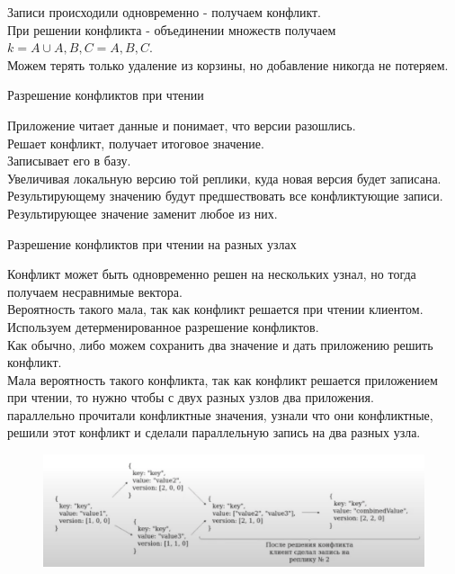 Записи происходили одновременно - получаем конфликт.\\
При решении конфликта - объединении множеств получаем $k = {A} \cup {A, B, C} = {A, B, C}.$\\
Можем терять только удаление из корзины, но добавление никогда не потеряем.\\
\begin{definition}
  Разрешение конфликтов при чтении
\end{definition}
Приложение читает данные и понимает, что версии разошлись.\\
Решает конфликт, получает итоговое значение.\\
Записывает его в базу.\\
Увеличивая локальную версию той реплики, куда новая версия будет записана.\\
Результирующему значению будут предшествовать все конфликтующие записи.\\
Результирующее значение заменит любое из них.\\
\begin{definition}
  Разрешение конфликтов при чтении на разных узлах
\end{definition}
Конфликт может быть одновременно решен на нескольких узнал, но тогда получаем несравнимые вектора.\\
Вероятность такого мала, так как конфликт решается при чтении клиентом.\\
Используем детерменированное разрешение конфликтов.\\
Как обычно, либо можем сохранить два значение и дать приложению решить конфликт.\\
Мала вероятность такого конфликта, так как конфликт решается приложением при чтении, то нужно чтобы с двух разных узлов два приложения.\\ параллельно прочитали конфликтные значения, узнали что они конфликтные, решили этот конфликт и сделали параллельную запись на два разных узла.\\
\begin{figure}[h]
    \centering
    \includegraphics[scale = 0.5]{../assets/5.png}
    \caption{}
\end{figure}
